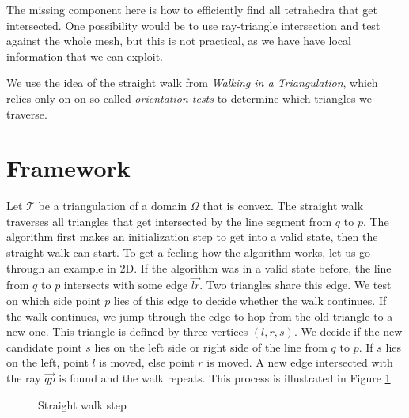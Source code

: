 \documentclass[../thesis.tex]{subfiles}
\begin{document}
The missing component here is how to efficiently find all tetrahedra
that get intersected. One possibility would be to use ray-triangle intersection and
test against the whole mesh, but this is not practical, as we have have local information
that we can exploit.


We use the idea of the straight walk from \emph{Walking in a Triangulation}\cite{Devillers}, which relies only on
on so called \emph{orientation tests} to determine which triangles we traverse.
\section{Framework}
Let $\mathcal{T}$ be a triangulation of a domain $\Omega$ that is convex.
The straight walk traverses all triangles that get intersected by the line segment
from $q$ to $p$. The algorithm first makes an initialization step to get into a valid state, 
then the straight walk can start.
To get a feeling how the algorithm works, let us go through an example in 2D.
If the algorithm was in a valid state before, the line from $q$ to $p$
intersects with some edge $\vec{lr}$. Two triangles share this edge.
We test on which side point $p$ lies of this edge to decide whether the walk continues.
If the walk continues, we jump through the edge to hop from the old triangle to a new one.
This triangle is defined by three vertices $(l,r,s)$. We decide if
the new candidate point $s$ lies on the left side or right side of the line from $q$ to $p$.
If $s$ lies on the left, point $l$ is moved, else point $r$ is moved.
A new edge intersected with the ray $\vec{qp}$ is found and the walk repeats.
This process is illustrated in Figure \ref{fig:straight-walk-2d}
\begin{figure}[htb]
  \centering
  \def\svgwidth{35em}
  
  \caption{Straight walk step}\label{fig:straight-walk-2d}        
\end{figure}
\end{document}
